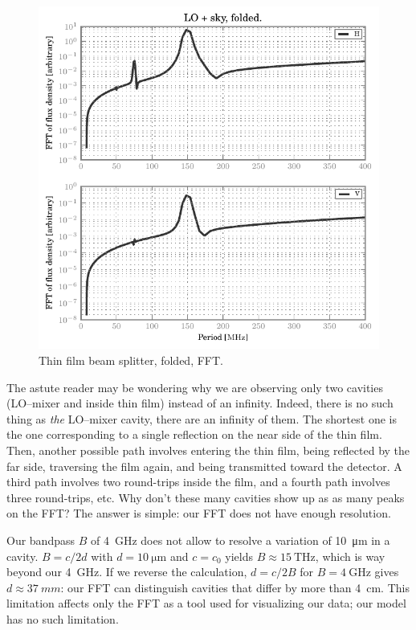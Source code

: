 \begin{figure}[hbtp]
    \centering
    \includegraphics{thin_film_beam_splitter_folded_fft}
    \caption{Thin film beam splitter, folded, FFT.}
    \label{fig:thin_film_beam_splitter_folded_fft}
\end{figure}

The astute reader may be wondering why we are observing only two cavities (LO--mixer and inside thin film) instead of an infinity.
Indeed, there is no such thing as \textit{the} LO--mixer cavity, there are an infinity of them.
The shortest one is the one corresponding to a single reflection on the near side of the thin film.
Then, another possible path involves entering the thin film, being reflected by the far side, traversing the film again, and being transmitted toward the detector.
A third path involves two round-trips inside the film, and a fourth path involves three round-trips, etc.
Why don't these many cavities show up as as many peaks on the FFT?
The answer is simple: our FFT does not have enough resolution.

Our bandpass $B$ of \SI{4}{\giga\hertz} does not allow to resolve a variation of \SI{10}{\micro\meter} in a cavity.
$B = c / 2d$ with $d=\SI{10}{\micro\meter}$ and $c=c_0$ yields $B \approx \SI{15}{\tera\hertz}$, which is way beyond our \SI{4}{\giga\hertz}.
If we reverse the calculation, $d=c/2B$ for $B=\SI{4}{\giga\hertz}$ gives $d \approx \SI{37}{mm}$: our FFT can distinguish cavities that differ by more than \SI{4}{\centi\meter}.
This limitation affects only the FFT as a tool used for visualizing our data; our model has no such limitation.

